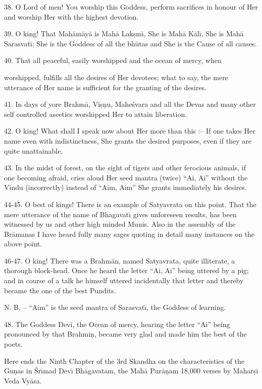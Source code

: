 38. O Lord of men! You worship this Goddess, perform sacrifices in honour of Her and worship Her with the highest devotion.

39. O king! That Mah\=am\=ay\=a is Mah\=a Lak\d{s}m\={\i}, She is Mah\=a K\=al\={\i}, She is Mah\=a Sarasvat\={\i}; She is the Goddess of all the bh\=utas and She is the Cause of all causes.

40. That all peaceful, easily worshipped and the ocean of mercy, when

worshipped, fulfills all the desires of Her devotees; what to say, the mere utterance of Her name is sufficient for the granting of the desires.

41. In days of yore Brahm\=a, Vi\d{s}\d{n}u, Mahe\'svara and all the Devas and many other self controlled ascetics worshipped Her to attain liberation.

42. O king! What shall I speak now about Her more than this :-- If one takes Her name even with indistinctness, She grants the desired purposes, even if they are quite unattainable.

43. In the midst of forest, on the sight of tigers and other ferocious animals, if one becoming afraid, cries aloud Her seed mantra (twice) ``Ai, Ai'' without the Vindu (incorrectly) instead of ``Aim, Aim'' She grants immediately his desires.

44-45. O best of kings! There is an example of Satyavrata on this point. That the mere utterance of the name of Bhagavat\={\i} gives unforeseen results, has been witnessed by us and other high minded Munis. Also in the assembly of the Br\=amanas I have heard fully many sages quoting in detail many instances on the above point.

46-47. O king! There was a Brahm\=an, named Satyavrata, quite illiterate, a thorough block-head. Once he heard the letter ``Ai, Ai'' being uttered by a pig; and in course of a talk he himself uttered incidentally that letter and thereby became the one of the best Pundits.

N. B. -- ``Aim'' is the seed mantra of Sarasvat\={\i}, the Goddess of learning.

48. The Goddess Dev\={\i}, the Ocean of mercy, hearing the letter ``Ai'' being pronounced by that Brahmi\d{n}, became very glad and made him the best of the poets.

Here ends the Ninth Chapter of the 3rd Skandha on the characteristics of the Gu\d{n}as in \'Sr\={\i}mad Dev\={\i} Bh\=agavatam, the Mah\=a Pur\=a\d{n}am 18,000 verses by Mahar\d{s}i Veda Vy\=asa.



